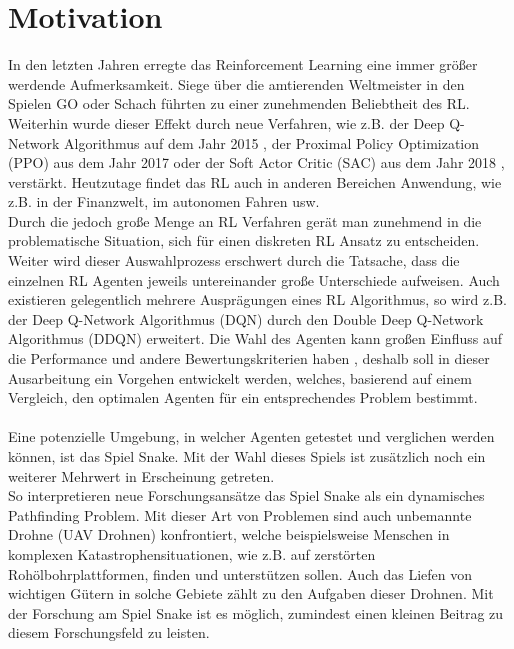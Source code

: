 \section{Motivation} \label{sec:Einleitung_Motivation}
In den letzten Jahren erregte das Reinforcement Learning eine immer größer werdende Aufmerksamkeit. Siege über die amtierenden Weltmeister in den Spielen GO oder Schach führten zu einer zunehmenden Beliebtheit des RL. Weiterhin wurde dieser Effekt durch neue Verfahren, wie z.B. der Deep Q-Network Algorithmus auf dem Jahr 2015 \citep{DQN}, der Proximal Policy Optimization (PPO) aus dem Jahr 2017 \citep{PPO} oder der Soft Actor Critic (SAC) aus dem Jahr 2018 \citep{SAC}, verstärkt. Heutzutage findet das RL auch in anderen Bereichen Anwendung, wie z.B. in der Finanzwelt, im autonomen Fahren usw.\\
Durch die jedoch große Menge an RL Verfahren gerät man zunehmend in die problematische Situation, sich für einen diskreten RL Ansatz zu entscheiden. Weiter wird dieser Auswahlprozess erschwert durch die Tatsache, dass die einzelnen RL Agenten jeweils untereinander große Unterschiede aufweisen. Auch existieren gelegentlich mehrere Ausprägungen eines RL Algorithmus, so wird z.B. der Deep Q-Network Algorithmus (DQN) durch den Double Deep Q-Network Algorithmus (DDQN) erweitert. Die Wahl des Agenten kann großen Einfluss auf die Performance und andere Bewertungskriterien haben \citep{Exploration_of_Reinforcement_Learning_to_SNAKE}, deshalb soll in dieser Ausarbeitung ein Vorgehen entwickelt werden, welches, basierend auf einem Vergleich, den optimalen Agenten für ein entsprechendes Problem bestimmt.\\
\\Eine potenzielle Umgebung, in welcher Agenten getestet und verglichen werden können, ist das Spiel Snake.
Mit der Wahl dieses Spiels ist zusätzlich noch ein weiterer Mehrwert in Erscheinung getreten.\\ 
So interpretieren neue Forschungsansätze das Spiel Snake als ein dynamisches Pathfinding Problem. Mit dieser Art von Problemen sind auch unbemannte Drohne (UAV Drohnen) konfrontiert, welche beispielsweise Menschen in komplexen Katastrophensituationen, wie z.B. auf zerstörten Rohölbohrplattformen, finden und unterstützen sollen. 
Auch das Liefen von wichtigen Gütern in solche Gebiete zählt zu den Aufgaben dieser Drohnen.
Mit der Forschung am Spiel Snake ist es möglich, zumindest einen kleinen Beitrag zu diesem Forschungsfeld zu leisten. \citep{UAV}

